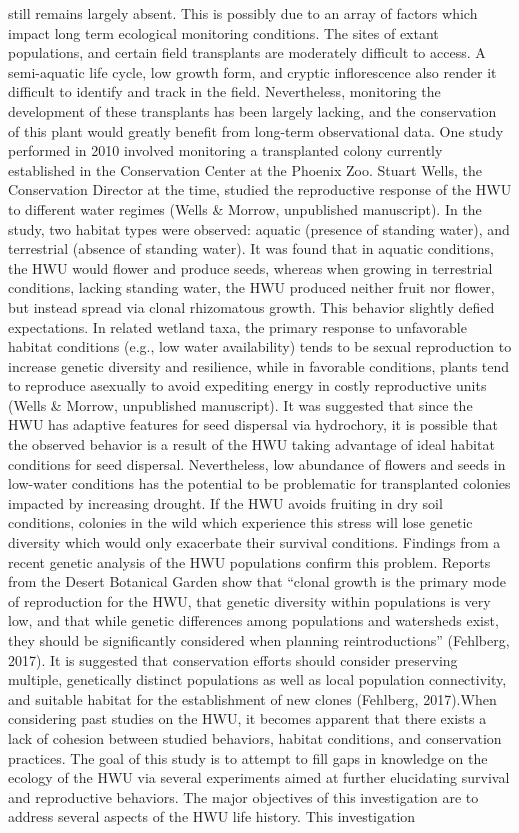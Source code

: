 \documentclass[multicol]{elsarticle}
\begin{document}
\begin{multicols}{2}
still remains largely absent. This is possibly due to an array of factors which impact long term ecological monitoring conditions. The sites of extant populations, and certain field transplants are moderately difficult to access. A semi-aquatic life cycle, low growth form, and cryptic inflorescence also render it difficult to identify and track in the field. Nevertheless, monitoring the development of these transplants has been largely lacking, and the conservation of this plant would greatly benefit from long-term observational data. One study performed in 2010 involved monitoring a transplanted colony currently established in the Conservation Center at the Phoenix Zoo. Stuart Wells, the Conservation Director at the time, studied the reproductive response of the HWU to different water regimes (Wells & Morrow, unpublished manuscript). In the study, two habitat types were observed: aquatic (presence of standing water), and terrestrial (absence of standing water). It was found that in aquatic conditions, the HWU would flower and produce seeds, whereas when growing in terrestrial conditions, lacking standing water, the HWU produced neither fruit nor flower, but instead spread via clonal rhizomatous growth. This behavior slightly defied expectations. In related wetland taxa, the primary response to unfavorable habitat conditions (e.g., low water availability) tends to be sexual reproduction to increase genetic diversity and resilience, while in favorable conditions, plants tend to reproduce asexually to avoid expediting energy in costly reproductive units (Wells & Morrow, unpublished manuscript). It was suggested that since the HWU has adaptive features for seed dispersal via hydrochory, it is possible that the observed behavior is a result of the HWU taking advantage of ideal habitat conditions for seed dispersal. Nevertheless, low abundance of flowers and seeds in low-water conditions has the potential to be problematic for transplanted colonies impacted by increasing drought. If the HWU avoids fruiting in dry soil conditions, colonies in the wild which experience this stress will lose genetic diversity which would only exacerbate their survival conditions. Findings from a recent genetic analysis of the HWU populations confirm this problem. Reports from the Desert Botanical Garden show that “clonal growth is the primary mode of reproduction for the HWU, that genetic diversity within populations is very low, and that while genetic differences among populations and watersheds exist, they should be significantly considered when planning reintroductions” (Fehlberg, 2017). It is suggested that conservation efforts should consider preserving multiple, genetically distinct populations as well as local population connectivity, and suitable habitat for the establishment of new clones (Fehlberg, 2017).When considering past studies on the HWU, it becomes apparent that there exists a lack of cohesion between studied behaviors, habitat conditions, and conservation practices. The goal of this study is to attempt to fill gaps in knowledge on the ecology of the HWU via several experiments aimed at further elucidating survival and reproductive behaviors. The major objectives of this investigation are to address several aspects of the HWU life history. This investigation 
\end{multicols}
\end{document}
